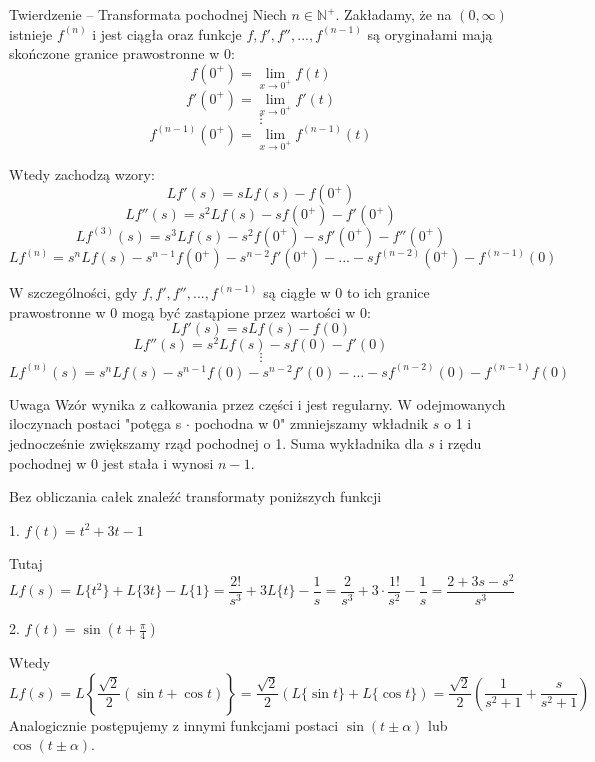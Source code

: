 \begin{tw}{Twierdzenie -- Transformata pochodnej}
    Niech $ n \in \mathbb{N}^+ $. Zakładamy, że na $ (0, \infty) $ istnieje $ f^{(n)} $ i jest ciągła oraz funkcje $ f, f', f'',..., f^{(n-1)} $ są 
    oryginałami mają skończone granice prawostronne w 0:
    \[ f(0^+) = \lim_{x \to 0^+} f(t) \]
    \[ f'(0^+) = \lim_{x \to 0^+} f'(t) \]
    \[ \vdots  \]
    \[ f^{(n - 1)} (0^+) = \lim_{x \to 0^+} f^{(n - 1)}(t) \]

    Wtedy zachodzą wzory: \medskip
    \[ Lf'(s) = sLf(s) - f(0^+) \]
    \[ Lf''(s) = s^2 Lf(s) - sf(0^+) - f'(0^+) \]
    \[ Lf^{(3)}(s) = s^3 Lf(s) - s^2 f(0^+) - sf'(0^+) - f''(0^+) \]
    \[ Lf^{(n)} = s^n Lf(s) - s^{n - 1} f(0^+) - s^{n - 2}f'(0^+) - ... - sf^{(n-2)}(0^+) - f^{(n-1)}(0) \]

    W szczególności, gdy $ f, f', f'', ..., f^{(n-1)} $ są ciągłe w 0 to ich granice prawostronne w 0 mogą być zastąpione przez wartości w 0:
    \[ Lf'(s) = sLf(s) - f(0) \]
    \[ Lf''(s) = s^2 Lf(s) - sf(0) - f'(0) \]
    \[ \vdots \]
    \[ Lf^{(n)}(s) = s^n Lf(s) - s^{n-1} f(0) - s^{n-2} f'(0) - ... - s f^{(n - 2)} (0) - f^{(n - 1)} f(0) \]
\end{tw}

\begin{blad}{Uwaga}
    Wzór wynika z całkowania przez części i jest regularny. W odejmowanych iloczynach postaci "potęga s $\cdot$ pochodna w 0" zmniejszamy wkładnik $s$ o 1
    i jednocześnie zwiększamy rząd pochodnej o 1. Suma wykładnika dla $s$ i rzędu pochodnej w 0 jest stała i wynosi $n - 1$.
\end{blad}

\bigskip

Bez obliczania całek znaleźć transformaty poniższych funkcji
\begin{przyklad}
    1. $ f(t) = t^2 + 3t - 1 $
    
    Tutaj
    \[ Lf(s) = L\{ t^2 \} + L\{3t\} - L\{1\} = \frac{2!}{s^3} + 3L\{ t \} - \frac{1}{s} = \frac{2}{s^3} + 3 \cdot \frac{1!}{s^2} - \frac{1}{s} = \frac{2 + 3s - s^2}{s^3} \]
\end{przyklad}

\begin{przyklad}
    2. $ f(t) = \sin \left( t + \frac{\pi}{4} \right) $

    Wtedy
    \[ Lf(s) = L \left\{ \frac{\sqrt{2}}{2}(\sin t + \cos t) \right\} = \frac{\sqrt{2}}{2}(L \{ \sin t \} + L \{ \cos t \}) = \frac{\sqrt{2}}{2} \left( \frac{1}{s^2 + 1} + \frac{s}{s^2 + 1} \right) \]
    Analogicznie postępujemy z innymi funkcjami postaci $ \sin (t \pm \alpha) $ lub $ \cos (t \pm \alpha) $. 
\end{przyklad}

